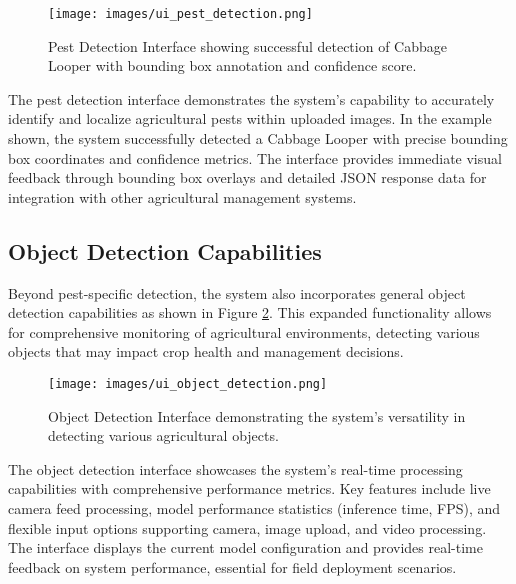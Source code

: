 \begin{figure}[H]
    \centering
    \texttt{[image: images/ui\_pest\_detection.png]}
    \caption{Pest Detection Interface showing successful detection of Cabbage Looper with bounding box annotation and confidence score.}
    \label{fig:ui_pest_detection_report}
\end{figure}

The pest detection interface demonstrates the system's capability to accurately identify and localize agricultural pests within uploaded images. In the example shown, the system successfully detected a Cabbage Looper with precise bounding box coordinates and confidence metrics. The interface provides immediate visual feedback through bounding box overlays and detailed JSON response data for integration with other agricultural management systems.

\subsection{Object Detection Capabilities}
Beyond pest-specific detection, the system also incorporates general object detection capabilities as shown in Figure \ref{fig:ui_object_detection_report}. This expanded functionality allows for comprehensive monitoring of agricultural environments, detecting various objects that may impact crop health and management decisions.

\begin{figure}[H]
    \centering
    \texttt{[image: images/ui\_object\_detection.png]}
    \caption{Object Detection Interface demonstrating the system's versatility in detecting various agricultural objects.}
    \label{fig:ui_object_detection_report}
\end{figure}

The object detection interface showcases the system's real-time processing capabilities with comprehensive performance metrics. Key features include live camera feed processing, model performance statistics (inference time, FPS), and flexible input options supporting camera, image upload, and video processing. The interface displays the current model configuration and provides real-time feedback on system performance, essential for field deployment scenarios.

